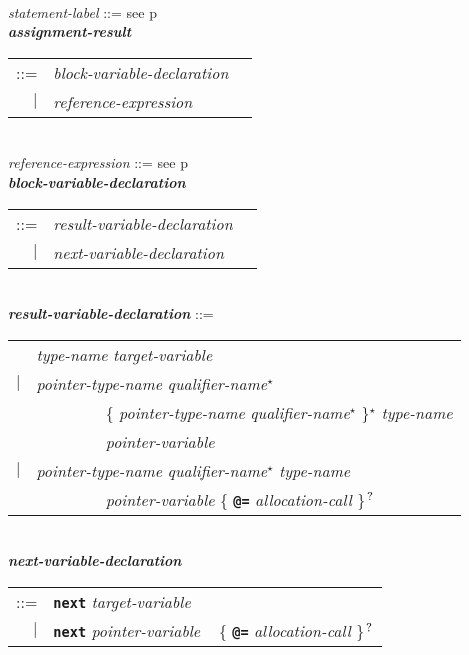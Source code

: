 \documentclass[12pt]{article}
\newcommand{\TT}[1]{{\tt \bfseries #1}}
\newcommand{\STAR}{{\Large $^\star$}}
\newcommand{\QMARK}{{$^{\,\mbox{\footnotesize ?}}$}}
\newcommand{\ttkey}[1]{{\tt \bfseries #1}}
\newcommand{\emkey}[1]{{\em \bfseries #1}}
\newcommand{\pagref}[1]{p\pageref{#1}}
\newenvironment{indpar}[1][0.3in]%
	{\begin{list}{}%
		     {\setlength{\itemsep}{0in}%
		      \setlength{\topsep}{0in}%
		      \setlength{\parsep}{1ex}%
		      \setlength{\labelwidth}{#1}%
		      \setlength{\leftmargin}{#1}%
		      \addtolength{\leftmargin}{\labelsep}}%
	 \item}%
	{\end{list}}
\begin{document}
\begin{indpar}
\\[0.5ex]
{\em statement-label} ::= see \pagref{STATEMENT-LABEL}
\\[0.5ex]
\emkey{assignment-result}\label{ASSIGNMENT-RESULT}
    \begin{tabular}[t]{@{}rll}
    ::= & {\em block-variable-declaration} \\
    $|$ & {\em reference-expression}
    \end{tabular}
\\[0.5ex]
{\em reference-expression} ::= see \pagref{REFERENCE-EXPRESSIONS}
\\[0.5ex]
\emkey{block-variable-declaration}\label{BLOCK-VARIABLE-DECLARATION}
    \begin{tabular}[t]{@{}rll}
    ::= & {\em result-variable-declaration} \\
    $|$ & {\em next-variable-declaration} \\
    \end{tabular}
\\[0.5ex]
\emkey{result-variable-declaration}\label{RESULT-VARIABLE-DECLARATION} ::= \\
\hspace*{0.5in}\begin{tabular}{rl}
	    & {\em type-name} {\em target-variable} \\
	$|$ & {\em pointer-type-name} {\em qualifier-name}\STAR{} \\
	    & ~~~~~~~~ \{ {\em pointer-type-name} {\em qualifier-name}\STAR{}
	               \}\STAR{} {\em type-name} \\
	    & ~~~~~~~~ {\em pointer-variable} \\
	$|$ & {\em pointer-type-name}
	      {\em qualifier-name}\STAR{} {\em type-name} \\
	    & ~~~~~~~~ {\em pointer-variable}
	               \{ \TT{@=} {\em allocation-call} \}\QMARK{} \\
	\end{tabular}
\\[0.5ex]
\emkey{next-variable-declaration}\label{NEXT-VARIABLE-DECLARATION} \\
\hspace*{0.5in}\begin{tabular}{rl}
      ::= & \ttkey{next} {\em target-variable} \\
      $|$ & \ttkey{next} {\em pointer-variable}
	      ~ \{ \TT{@=} {\em allocation-call} \}\QMARK{} \\
      \end{tabular}
\\[0.5ex]

\end{indpar}
\end{document}
